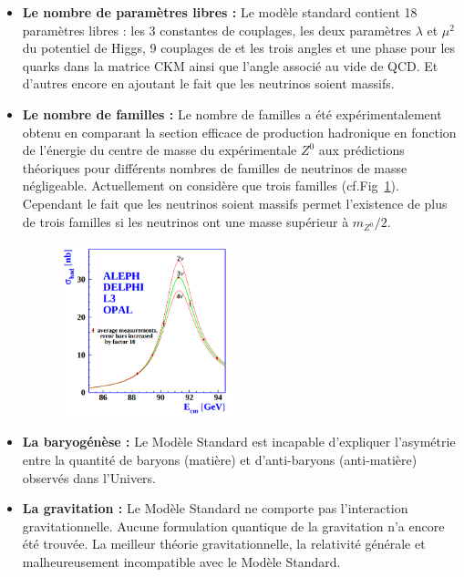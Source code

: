 \begin{itemize}[label=$\bullet$]
\item \textbf{Le nombre de paramètres libres :} Le modèle standard contient \num{18} paramètres libres : les \num{3} constantes de couplages, les deux paramètres $\lambda$ et $\mu^2$ du potentiel de Higgs, \num{9} couplages de  et les trois angles et une phase pour les quarks dans la matrice CKM ainsi que l'angle associé au vide de QCD. Et d'autres encore en ajoutant le fait que les neutrinos soient massifs.

\item \textbf{Le nombre de familles :} Le nombre de familles a été expérimentalement obtenu en comparant la section efficace de production hadronique en fonction de l'énergie du centre de masse du expérimentale $Z^{0}$ aux prédictions théoriques pour différents nombres de familles de neutrinos de masse négligeable. Actuellement on considère que trois familles (cf.Fig~\ref{neutrinos}). Cependant le fait que les neutrinos soient massifs permet l'existence de plus de trois familles si les neutrinos ont une masse supérieur à $m_{Z^{0}}/2$.
\begin{figure}[ht!]
\centering
\includegraphics[width=0.48\textwidth]{SM/neutrinos.png}
\label{neutrinos}
\end{figure}

\item \textbf{La baryogénèse :} Le Modèle Standard est incapable d'expliquer l'asymétrie entre la quantité de baryons (matière) et d'anti-baryons (anti-matière) observés dans l'Univers.

\item \textbf{La gravitation :} Le Modèle Standard ne comporte pas l'interaction gravitationnelle. Aucune formulation quantique de la gravitation n'a encore été trouvée. La meilleur théorie gravitationnelle, la relativité générale et malheureusement incompatible avec le Modèle Standard.


\end{itemize}
